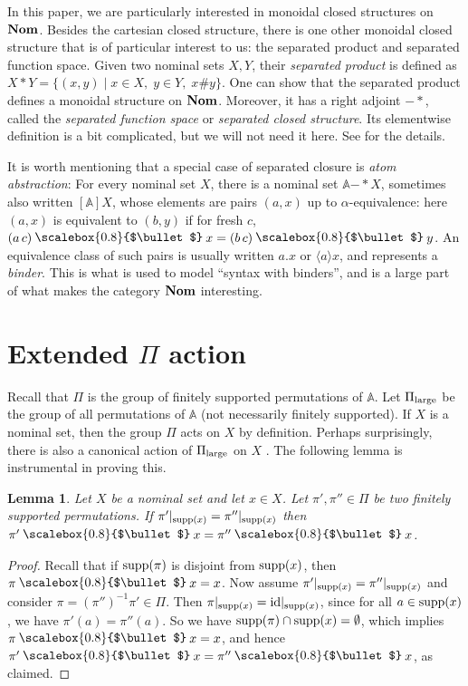 \documentclass[11pt,a4paper]{amsart}
\theoremstyle{plain}
\newtheorem{xlem}[xtheorem]{Lemma}
\theoremstyle{definition}
\theoremstyle{remark}
\newcommand{\PI}{\Pi}
\newcommand{\PIL}{\PI_{\text{\rm large}}}
\newcommand{\Nom}{\textrm{\bf Nom}}
\newcommand{\aA}{\mathbb{A}}
\newcommand{\supp}{\mathop{\text{\rm supp}}}
\newcommand{\restr}[1]{|_{#1}}
\newcommand{\id}{\text{\textrm{id}}}
\newcommand{\set}[1]{\{#1\}}
\let\oldbullet\bullet
\newcommand{\action}{\mathbin{\text{\raisebox{0.15ex}{\scalebox{0.8}{$\oldbullet$}}}}}
\newcommand{\bul}{\action}
\newcommand{\inv}{^{-1}}
\newcommand{\magicwand}{\mathbin{-\!*}}
\begin{document}
In this paper, we are particularly interested in monoidal closed
structures on $\Nom$. Besides the cartesian closed structure, there is
one other monoidal closed structure that is of particular interest to
us: the separated product and separated function space. Given two
nominal sets $X,Y$, their \emph{separated product} is defined as
$X\ast Y = \set{(x,y)\mid x\in X,\;y\in Y,\; x\# y}$. One can show
that the separated product defines a monoidal structure on
$\Nom$. Moreover, it has a right adjoint $\magicwand$, called the
\emph{separated function space} or \emph{separated closed structure}.
Its elementwise definition is a bit complicated, but we will not need
it here. See {\cite[Def.~3.2]{Clouston2013}} for the details.

It is worth mentioning that a special case of separated closure is
\emph{atom abstraction}: For every nominal set $X$, there is a nominal
set $\aA\magicwand X$, sometimes also written $[\aA]X$, whose elements
are pairs $(a,x)$ up to $\alpha$-equivalence: here $(a,x)$ is
equivalent to $(b,y)$ if for fresh $c$, $(a\,c)\bul x = (b\,c)\bul y$.
An equivalence class of such pairs is usually written $a.x$ or
$\langle a\rangle x$, and represents a \emph{binder}. This is what is
used to model ``syntax with binders'', and is a large part of what
makes the category $\Nom$ interesting.


\section{Extended $\Pi$ action}
\label{sec:large-action}

Recall that $\PI$ is the group of finitely supported permutations of
$\aA$. Let $\PIL$ be the group of all permutations of $\aA$ (not
necessarily finitely supported). If $X$ is a nominal set, then the
group $\PI$ acts on $X$ by definition. Perhaps surprisingly, there is
also a canonical action of $\PIL$ on $X$ \cite{Gadducci2006,milius2016}. The following lemma is
instrumental in proving this.

\begin{xlem}\label{LemSuppAct}
  Let $X$ be a nominal set and let $x\in X$. Let $\pi' ,\pi'' \in \Pi$
  be two finitely supported permutations. If
  $\pi'\restr{\supp(x)}=\pi''\restr{\supp(x)}$ then $\pi' \bul x = \pi''
  \bul x$.
\end{xlem}

\begin{proof}
  Recall that if $\supp(\pi)$ is disjoint from $\supp(x)$, then
  $\pi\bul x = x$.  Now assume
  $\pi'\restr{\supp(x)}=\pi''\restr{\supp(x)}$ and consider
  $\pi=\left( \pi''\right)\inv \pi'\in \Pi$. Then
  $\pi\restr{\supp(x)}=\id\restr{\supp(x)}$, since for all $a\in
  \supp(x)$, we have $\pi'(a)=\pi''(a)$. So we have $\supp(\pi)\cap
  \supp(x)=\emptyset$, which implies $\pi\bul x=x$, and hence
  $\pi'\bul x=\pi''\bul x$, as claimed.
\end{proof}
\end{document}
